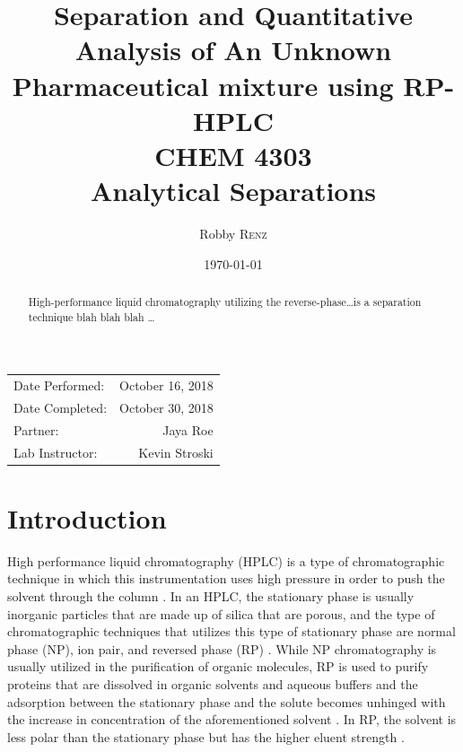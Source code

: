 \documentclass[a4paper, 12pt]{article}
\title{Separation and Quantitative Analysis of An Unknown Pharmaceutical mixture using RP-HPLC \\ CHEM 4303 \\ Analytical Separations} %
\author{Robby \textsc{Renz}} %
\date{\today} %
\begin{document}
\maketitle %

\begin{center}
\begin{tabular}{l r}
Date Performed: & October 16, 2018 \\ %
Date Completed: & October 30, 2018 \\
Partner: & Jaya Roe \\ %
Lab Instructor: & Kevin Stroski %
\end{tabular}
\end{center}


\begin{abstract}
	High-performance liquid chromatography utilizing the reverse-phase\dots{}is a separation technique blah blah blah \dots
\end{abstract}
\newpage


\section{Introduction}
High performance liquid chromatography (HPLC) is a type of chromatographic technique in which this instrumentation uses high pressure in order to push the solvent through the column \cite{harris}. In an HPLC, the stationary phase is usually inorganic particles that are made up of silica that are porous, and the type of chromatographic techniques that utilizes this type of stationary phase are normal phase (NP), ion pair, and reversed phase (RP) \cite{mold}. While NP chromatography is usually utilized in the purification of organic molecules, RP is used to purify proteins that are dissolved in organic solvents and aqueous buffers and the adsorption between the stationary phase and the solute becomes unhinged with the increase in concentration of the aforementioned solvent \cite{prep_hplc}. In RP, the solvent is less polar than the stationary phase but has the higher eluent strength \cite{harris}. 
\end{document}
